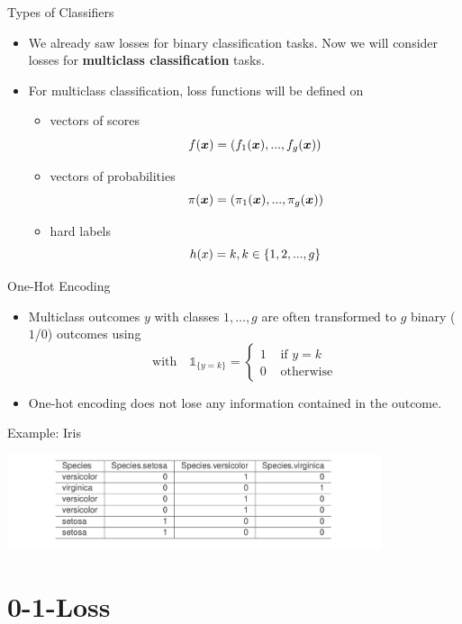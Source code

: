 \begin{vbframe}{Types of Classifiers}
\begin{itemize}
  \item We already saw losses for binary classification tasks. 
  Now we will consider losses for \textbf{multiclass classification} tasks.
  \lz
  \item For multiclass classification, loss functions will be defined on
  \begin{itemize}
    \item vectors of scores $$f(\bm{x}) = \left(f_1(\bm{x}), ..., f_g(\bm{x})\right)$$
    \item vectors of probabilities $$\pi(\bm{x}) = \left(\pi_1(\bm{x}), ..., \pi_g(\bm{x})\right)$$
    \item hard labels $$h(x) = k, k \in \{1, 2, ..., g\}$$
\end{itemize}
\end{itemize}
\end{vbframe}

\begin{vbframe}{One-Hot Encoding}
\begin{itemize}
\item Multiclass outcomes $y$ with classes $1,\dots, g$ are often transformed to $g$ binary ($1$/$0$) outcomes 
using 
$$
\text{with}\quad \mathds{1}_{\{y = k\}} = \begin{cases} 1 & \text{ if } y = k \\
0 & \text{ otherwise}\end{cases}
$$
\item One-hot encoding does not lose any information contained in the outcome. 
\end{itemize}
\vspace{0.2cm}
Example: Iris

\vspace*{0.1cm}
\begin{center}
\includegraphics[width = 11cm ]{figure_man/Iris.png}
\end{center}

\end{vbframe}

\section{0-1-Loss}

